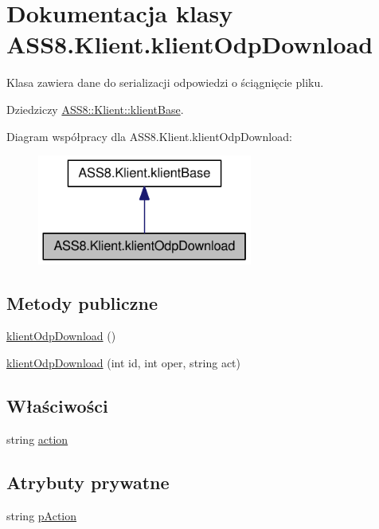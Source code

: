 \hypertarget{a00010}{
\section{Dokumentacja klasy ASS8.Klient.klientOdpDownload}
\label{d7/dec/a00010}
}
Klasa zawiera dane do serializacji odpowiedzi o ściągnięcie pliku.  


Dziedziczy \hyperlink{a00007}{ASS8::Klient::klientBase}.

Diagram współpracy dla ASS8.Klient.klientOdpDownload:\nopagebreak
\begin{figure}[H]
\begin{center}
\leavevmode
\includegraphics[width=200pt]{d3/d2a/a00195}
\end{center}
\end{figure}
\subsection*{Metody publiczne}
\begin{CompactItemize}
\item 
\hyperlink{a00010_39b02a7d62f5f5d1fc3f027bc1ab666b}{klientOdpDownload} ()
\item 
\hyperlink{a00010_31174bd92b052586e1bb093bf631f330}{klientOdpDownload} (int id, int oper, string act)
\end{CompactItemize}
\subsection*{Właściwości}
\begin{CompactItemize}
\item 
string \hyperlink{a00010_f1e41ed2ca8b161225883d79faa35121}{action}
\end{CompactItemize}
\subsection*{Atrybuty prywatne}
\begin{CompactItemize}
\item 
string \hyperlink{a00010_50dcb80ebd84c9929250c659e169fea9}{pAction}
\end{CompactItemize}


